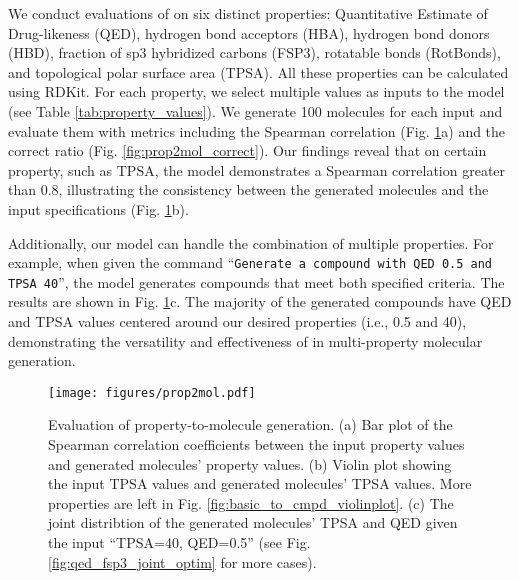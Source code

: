 We conduct evaluations of \ourM{} on six distinct properties: Quantitative Estimate of Drug-likeness (QED), hydrogen bond acceptors (HBA), hydrogen bond donors (HBD), fraction of sp3 hybridized carbons (FSP3), rotatable bonds (RotBonds), and topological polar surface area (TPSA). All these properties can be calculated using RDKit. For each property, we select multiple values as inputs to the model (see Table \ref{tab:property_values}). We generate 100 molecules for each input and evaluate them with metrics including the Spearman correlation (Fig. \ref{fig:property2mol}a) and the correct ratio (Fig. \ref{fig:prop2mol_correct}). %
Our findings reveal that on certain property, such as TPSA, the model demonstrates a Spearman correlation greater than 0.8, illustrating the consistency between the generated molecules and the input specifications (Fig. \ref{fig:property2mol}b).
\iffalse
\begin{figure}
    \centering
    \texttt{[image: figures/property2mol.png]}
    \caption{property-to-molecule generation \textcolor{blue}{check novel only; tspa relaxed}}
    \label{fig:property2mol}
\end{figure}
\fi

Additionally, our model can handle the combination of multiple properties. For example, when given the command ``\texttt{Generate a compound with QED 0.5 and TPSA 40}'', the model generates compounds that meet both specified criteria. The results are shown in Fig. \ref{fig:property2mol}c. The majority of the generated compounds have QED and TPSA values centered around our desired properties (i.e., 0.5 and 40), demonstrating the versatility and effectiveness of \ourM{} in multi-property molecular generation. 


\begin{figure}[!htbp]
    \centering
    \texttt{[image: figures/prop2mol.pdf]}
    \caption{Evaluation of property-to-molecule generation. (a) Bar plot of the Spearman correlation coefficients between the input property values and generated molecules' property values. (b) Violin plot showing the input TPSA values and generated molecules' TPSA values. More properties are left in Fig. \ref{fig:basic_to_cmpd_violinplot}. (c) The joint distribtion of the generated molecules' TPSA and QED given the input ``TPSA=40, QED=0.5'' (see Fig. \ref{fig:qed_fsp3_joint_optim} for more cases).}
    \label{fig:property2mol}
\end{figure}


